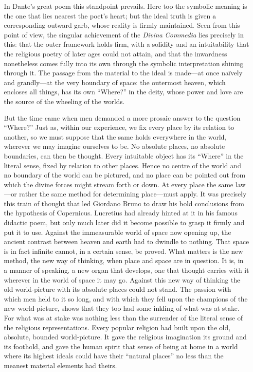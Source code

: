\documentclass[12pt,a4paper]{article}
\newcommand{\opage}[1]{\marginnote{\footnotesize\textit{[#1]}}}
\begin{document}
In Dante's great poem this standpoint prevails. Here too the symbolic meaning is
the one that lies nearest the poet's heart; but the ideal truth is given a
corresponding outward garb, whose reality is firmly maintained. Seen from this
point of view, the singular achievement of the \emph{Divina Commedia} lies
precisely in this: that the outer framework holds firm, with a solidity and an
intuitability that the religious poetry of later ages could not attain, and that
the inwardness nonetheless comes fully into its own through the symbolic
interpretation shining through it. The passage from the material to the ideal is
made---at once naïvely and grandly---at the very boundary of space: the outermost
heaven, which encloses all things, has its own ``Where?'' in the deity, whose
power and love are the source of the wheeling of the worlds.

But the time came when men demanded a more prosaic answer to the question
``Where?'' Just as, within our experience, we fix every place by its relation to
another, so we must suppose that the same holds everywhere in the world, wherever
we may imagine ourselves to be. No absolute places, no absolute boundaries, can
then be thought. Every intuitable object has its ``Where'' in the literal sense,
fixed by relation to other places. Hence no centre of the world and no boundary
of the world can be pictured, and no place can be pointed out from which the
divine forces might stream forth or down. At every place the same law---or rather
the same method for determining place---must apply. It was precisely this train of
thought that led \opage{8}Giordano Bruno to draw his bold conclusions from the hypothesis
of Copernicus. Lucretius had already hinted at it in his famous didactic poem, but
only much later did it become possible to grasp it firmly and put it to use.
Against the immeasurable world of space now opening up, the ancient contrast
between heaven and earth had to dwindle to nothing. That space is in fact infinite
cannot, in a certain sense, be proved. What matters is the new method, the new way
of thinking, when place and space are in question. It is, in a manner of speaking,
a new organ that develops, one that thought carries with it wherever in the world
of space it may go. Against this new way of thinking the old world-picture with
its absolute places could not stand. The passion with which men held to it so
long, and with which they fell upon the champions of the new world-picture, shows
that they too had some inkling of what was at stake. For what was at stake was
nothing less than the surrender of the literal sense of the religious
representations. Every popular religion had built upon the old, absolute, bounded
world-picture. It gave the religious imagination its ground and its foothold, and
gave the human spirit that sense of being at home in a world where its highest
ideals could have their ``natural places'' no less than the meanest material
elements had theirs.
\end{document}
